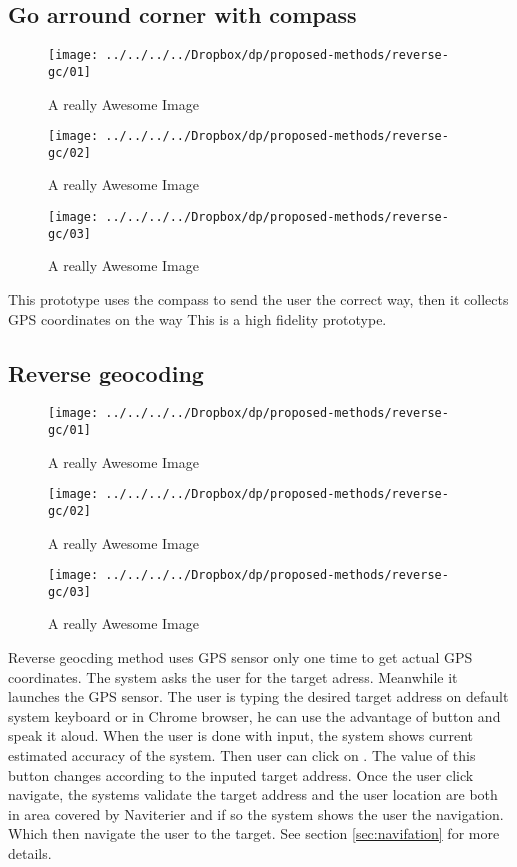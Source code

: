 \documentclass[11pt,oneside,a4paper]{book}
\begin{document}
			\subsection{Go arround corner with compass}
				\begin{figure}[!htb]
					\texttt{[image: ../../../../Dropbox/dp/proposed-methods/reverse-gc/01]}
					\caption{A really Awesome Image}\label{fig:awesome_image1}
					\endminipage\hfill
					\texttt{[image: ../../../../Dropbox/dp/proposed-methods/reverse-gc/02]}
					\caption{A really Awesome Image}\label{fig:awesome_image2}
					\endminipage\hfill
					\texttt{[image: ../../../../Dropbox/dp/proposed-methods/reverse-gc/03]}
					\caption{A really Awesome Image}\label{fig:awesome_image3}
					\endminipage
				\end{figure}
			
				This prototype uses the compass to send the user the correct way, then it collects GPS coordinates on the way
				This is a high fidelity prototype.
			\subsection{Reverse geocoding}
		
			\begin{figure}[!htb]
				\texttt{[image: ../../../../Dropbox/dp/proposed-methods/reverse-gc/01]}
				\caption{A really Awesome Image}\label{fig:awesome_image1}
				\endminipage\hfill
				\texttt{[image: ../../../../Dropbox/dp/proposed-methods/reverse-gc/02]}
				\caption{A really Awesome Image}\label{fig:awesome_image2}
				\endminipage\hfill
				\texttt{[image: ../../../../Dropbox/dp/proposed-methods/reverse-gc/03]}
				\caption{A really Awesome Image}\label{fig:awesome_image3}
				\endminipage
			\end{figure}
	
			Reverse geocding method uses GPS sensor only one time to get actual GPS coordinates. 
			The system asks the user for the target adress. Meanwhile it launches the GPS sensor.
			The user is typing the desired target address on default system keyboard or in Chrome browser, he can use the advantage of button  and speak it aloud.
			When the user is done with input, the system shows current estimated accuracy of the system.
			Then user can click on . The value of this button changes according to the inputed target address.
			Once the user click navigate, the systems validate the target address and the user location are both in area covered by Naviterier and if so the system shows the user the navigation. Which then navigate the user to the target. See section \ref{sec:navifation} for more details.
			
\end{document}
